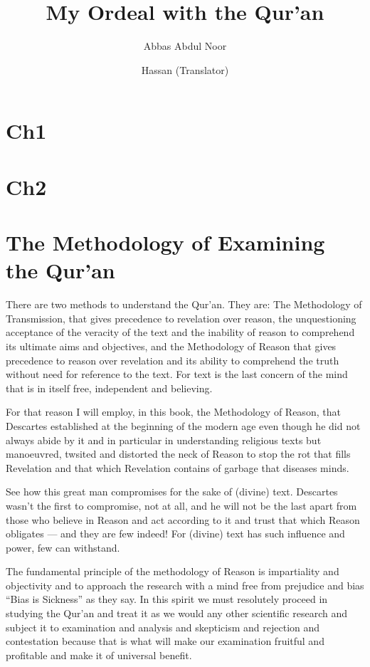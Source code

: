 \documentclass[12pt]{book}
\title{My Ordeal with the Qur’an}
\author{Abbas Abdul Noor \and Hassan (Translator)}
\begin{document}
\maketitle

\setcounter{page}{1}
\tableofcontents



\chapter{Ch1}

\chapter{Ch2}

\chapter{The Methodology of Examining the Qur’an}

There are two methods to understand the Qur’an. They are: The Methodology of
Transmission, that gives precedence to revelation over reason, the
unquestioning acceptance of the veracity of the text and the inability of
reason to comprehend its ultimate aims and objectives, and the Methodology of
Reason that gives precedence to reason over revelation and its ability to
comprehend the truth without need for reference to the text. For text is the
last concern of the mind that is in itself free, independent and believing.

For that reason I will employ, in this book, the Methodology of Reason, that
Descartes established at the beginning of the modern age even though he did not
always abide by it and in particular in understanding religious texts but
manoeuvred, twsited and distorted the neck of Reason to stop the rot that fills
Revelation and that which Revelation contains of garbage that diseases minds.

See how this great man compromises for the sake of (divine) text. Descartes
wasn’t the first to compromise, not at all, and he will not be the last apart
from those who believe in Reason and act according to it and trust that which
Reason obligates — and they are few indeed! For (divine) text has such
influence and power, few can withstand.

The fundamental principle of the methodology of Reason is impartiality and
objectivity and to approach the research with a mind free from prejudice and
bias “Bias is Sickness” as they say. In this spirit we must resolutely proceed
in studying the Qur’an and treat it as we would any other scientific research
and subject it to examination and analysis and skepticism and rejection and
contestation because that is what will make our examination fruitful and
profitable and make it of universal benefit.
\end{document}
